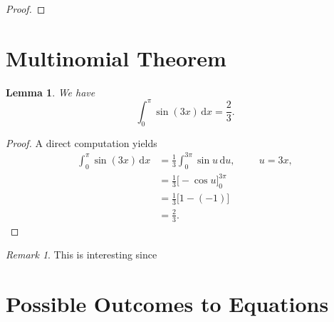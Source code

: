 \documentclass{article}
\theoremstyle{plain}
\newtheorem{lemma}{Lemma}
\theoremstyle{definition}
\theoremstyle{remark}
\newtheorem{remark}{Remark}
\renewcommand{\d}{\mathrm{d}}
\begin{document}
\begin{proof}

\end{proof}




\section{Multinomial Theorem}

\begin{lemma}
	We have
	\[
		\int_0^\pi \sin(3x)\,\d x = \frac{2}{3}.
	\]
\end{lemma}

\begin{proof}
	A direct computation yields
	\begin{align*}
		\int_0^\pi \sin(3x)\,\d x
			&=	\frac{1}{3}\int_0^{3\pi} \sin u \,\d u,		\hspace{1cm} u=3x,		\\
			&=	\frac{1}{3} \big[-\cos u\big]_0^{3\pi}						\\
			&=	\frac{1}{3} \big[1-(-1)\big]						\\
			&=	\frac{2}{3}.
	\end{align*}
\end{proof}

\begin{remark}
	This is interesting since\textellipsis
\end{remark}

\section{Possible Outcomes to Equations}
\end{document}
